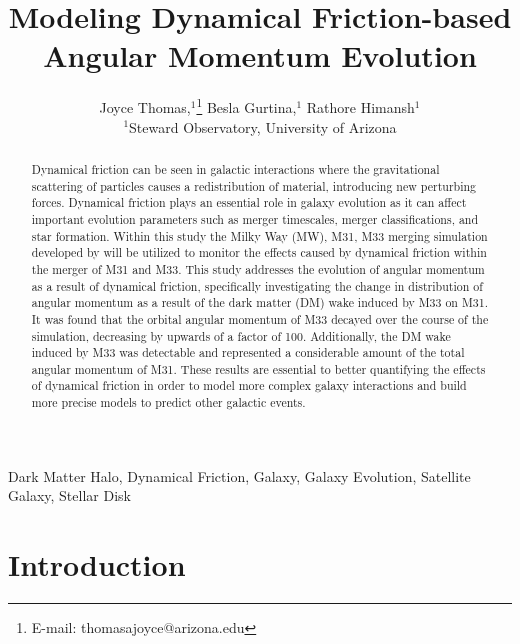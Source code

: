 \documentclass[fleqn,usenatbib]{mnras}
\title[Angular Momentum Evolution of M33 and M31]{Modeling Dynamical Friction-based Angular Momentum Evolution}
\author[Joyce]{
Joyce Thomas,$^{1}$\thanks{E-mail: thomasajoyce@arizona.edu}
Besla Gurtina,$^{1}$
Rathore Himansh$^{1}$
\\
$^{1}$Steward Observatory, University of Arizona
}
\begin{document}
\label{firstpage}
\pagerange{\pageref{firstpage}--\pageref{lastpage}}
\maketitle

\begin{abstract}
Dynamical friction can be seen in galactic interactions where the gravitational scattering of particles causes a redistribution of material, introducing new perturbing forces. Dynamical friction plays an essential role in galaxy evolution as it can affect important evolution parameters such as merger timescales, merger classifications, and star formation. Within this study the Milky Way (MW), M31, M33 merging simulation developed by \citep{vandermarel2012} will be utilized to monitor the effects caused by dynamical friction within the merger of M31 and M33. This study addresses the evolution of angular momentum as a result of dynamical friction, specifically investigating the change in distribution of angular momentum as a result of the dark matter (DM) wake induced by M33 on M31. It was found that the orbital angular momentum of M33 decayed over the course of the simulation, decreasing by upwards of a factor of 100. Additionally, the DM wake induced by M33 was detectable and represented a considerable amount of the total angular momentum of M31. These results are essential to better quantifying the effects of dynamical friction in order to model more complex galaxy interactions and build more precise models to predict other galactic events. 
\end{abstract}


\begin{keywords}
Dark Matter Halo, Dynamical Friction, Galaxy, Galaxy Evolution, Satellite Galaxy, Stellar Disk
\end{keywords}



\section{Introduction}  %
\end{document}
